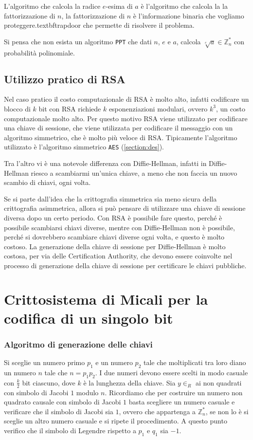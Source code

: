 L'algoritmo che calcola la radice $e$-esima di $a$ è l'algoritmo che calcola la
la fattorizzazione di $n$, la fattorizzazione di $n$ è l'informazione 
binaria che vogliamo proteggere.textbf{trapdoor} che permette di risolvere 
il problema.
\begin{tcolorbox}[title=Fattorizzazione di $n$]
  Si pensa che non esista un algoritmo \texttt{PPT} che dati $n$, $e$ e $a$,
  calcola $\sqrt[e]{a} \in \mathbb{Z}_n^*$ con probabilità polinomiale.
\end{tcolorbox}
\subsection{Utilizzo pratico di RSA}
Nel caso pratico il costo computazionale di RSA è molto alto, infatti codificare 
un blocco di $k$ bit con RSA richiede $k$ esponenziazioni modulari, ovvero $k^3$, 
un costo computazionale molto alto. Per questo motivo RSA viene utilizzato per
codificare una chiave di sessione, che viene utilizzata per codificare
il messaggio con un algoritmo simmetrico, che è molto più veloce di RSA.
Tipicamente l'algoritmo utilizzato è l'algoritmo simmetrico \texttt{AES} (\ref{section:des}).

Tra l'altro vi è una notevole differenza con Diffie-Hellman, infatti in Diffie-Hellman
riesco a scambiarmi un'unica chiave, a meno che non faccia un nuovo scambio di chiavi,
ogni volta.

Se si parte dall'idea che la crittografia simmetrica sia meno sicura della crittografia
asimmetrica, allora si può pensare di utilizzare una chiave di sessione diversa dopo 
un certo periodo. Con RSA è possibile fare questo, perché è possibile scambiarsi
chiavi diverse, mentre con Diffie-Hellman non è possibile, perché si dovrebbero scambiare
chiavi diverse ogni volta, e questo è molto costoso. La generazione della chiave di sessione 
per Diffie-Hellman è molto costosa, per via delle Certification Authority, che devono
essere coinvolte nel processo di generazione della chiave di sessione per certificare 
le chiavi pubbliche.

\section{Crittosistema di Micali per la codifica di un singolo bit}
\subsubsection{Algoritmo di generazione delle chiavi}
Si sceglie un numero primo $p_1$ e un numero $p_2$ tale che moltiplicati tra loro
diano un numero $n$ tale che $n = p_1p_2$. I due numeri devono essere scelti in modo
casuale con $\frac{k}{2}$ bit ciascuno, dove $k$ è la lunghezza della chiave. Sia 
$y \in_R$ ai non quadrati con simbolo di Jacobi $1$ modulo $n$. Ricordiamo che per 
costruire un numero non quadrato causale con simbolo di Jacobi $1$ basta scegliere un numero
casuale e verificare che il simbolo di Jacobi sia $1$, ovvero che appartenga 
a $\mathbb{Z}_n^*$, se non lo è si sceglie un altro
numero casuale e si ripete il procedimento. A questo punto verifico che il simbolo 
di Legendre rispetto a $p_1$ e $q_1$ sia $-1$. 

